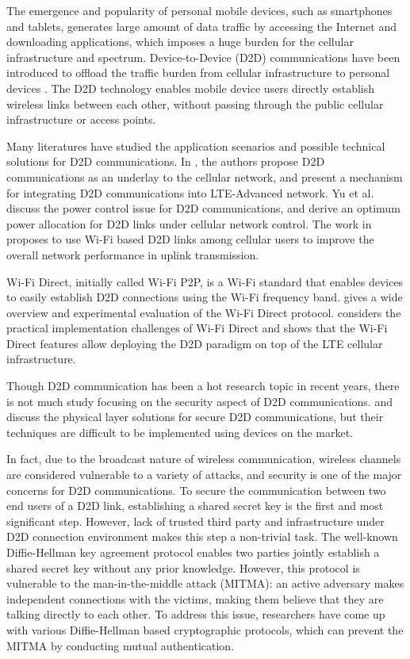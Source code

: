 \documentclass[conference]{IEEEtran}
\begin{document}
The emergence and popularity of personal mobile devices, such as smartphones and tablets, generates large amount of data traffic by accessing the Internet and downloading applications, which imposes a huge burden for the cellular infrastructure and spectrum. Device-to-Device (D2D) communications have been introduced to offload the traffic burden from cellular infrastructure to personal devices \cite{d2d}. The D2D technology enables mobile device users directly establish wireless links between each other, without passing through the public cellular infrastructure or access points. 

Many literatures have studied the application scenarios and possible technical solutions for D2D communications. In \cite{d2dlte}, the authors propose D2D communications as an underlay to the cellular network, and present a mechanism for integrating D2D communications into LTE-Advanced network. Yu et al. \cite{d2dp, d2dp2} discuss the power control issue for D2D communications, and derive an optimum power allocation for D2D links under cellular network control. The work in \cite{5} proposes to use Wi-Fi based D2D links among cellular users to improve the overall network performance in uplink transmission. 

Wi-Fi Direct, initially called Wi-Fi P2P, is a Wi-Fi standard that enables devices to easily establish D2D connections using the Wi-Fi frequency band. \cite{wifidirect} gives a wide overview and experimental evaluation of the Wi-Fi Direct protocol. \cite{wifid2d} considers the practical implementation challenges of Wi-Fi Direct and shows that the Wi-Fi Direct features allow deploying the D2D paradigm on top of the LTE cellular infrastructure.

Though D2D communication has been a hot research topic in recent years, there is not much study focusing on the security aspect of D2D communications. \cite{phy1} and \cite{phy2} discuss the physical layer solutions for secure D2D communications, but their techniques are difficult to be implemented using devices on the market. 

In fact, due to the broadcast nature of wireless communication, wireless channels are considered vulnerable to a variety of attacks, and security is one of the major concerns for D2D communications. To secure the communication between two end users of a D2D link, establishing a shared secret key is the first and most significant step. However, lack of trusted third party and infrastructure under D2D connection environment makes this step a non-trivial task. The well-known Diffie-Hellman key agreement protocol enables two parties jointly establish a shared secret key without any prior knowledge. However, this protocol is vulnerable to the man-in-the-middle attack (MITMA)\cite{mao}: an active adversary makes independent connections with the victims, making them believe that they are talking directly to each other. To address this issue, researchers have come up with various Diffie-Hellman based cryptographic protocols, which can prevent the MITMA by conducting mutual authentication.
\end{document}
